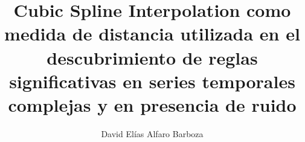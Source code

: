 \title{{\large\bf{Cubic Spline Interpolation como medida de distancia utilizada en el descubrimiento de reglas significativas en series temporales complejas y en presencia de ruido}}}
\author{David El\'ias Alfaro Barboza}
\maketitle
\begin{abstractpage}

\end{abstractpage}	
